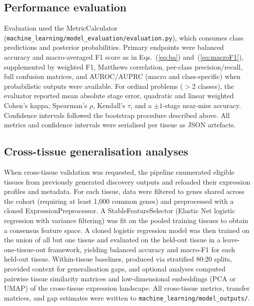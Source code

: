 \documentclass[11pt]{article}
\begin{document}
\subsection{Performance evaluation}
Evaluation used the MetricCalculator (\texttt{machine\_learning/model\_evaluation/evaluation.py}), which consumes class predictions and posterior probabilities. Primary endpoints were balanced accuracy and macro-averaged F1 score as in Eqs.~(\ref{eq:ba}) and~(\ref{eq:macroF1}), supplemented by weighted F1, Matthews correlation, per-class precision/recall, full confusion matrices, and AUROC/AUPRC (macro and class-specific) when probabilistic outputs were available. For ordinal problems ($>$2 classes), the evaluator reported mean absolute stage error, quadratic and linear weighted Cohen's kappa, Spearman's $\rho$, Kendall's $\tau$, and a $\pm 1$-stage near-miss accuracy. Confidence intervals followed the bootstrap procedure described above. All metrics and confidence intervals were serialised per tissue as JSON artefacts.

\subsection{Cross-tissue generalisation analyses}
When cross-tissue validation was requested, the pipeline enumerated eligible tissues from previously generated discovery outputs and reloaded their expression profiles and metadata. For each tissue, data were filtered to genes shared across the cohort (requiring at least 1{,}000 common genes) and preprocessed with a cloned ExpressionPreprocessor. A StableFeatureSelector (Elastic Net logistic regression with variance filtering) was fit on the pooled training tissues to obtain a consensus feature space. A cloned logistic regression model was then trained on the union of all but one tissue and evaluated on the held-out tissue in a leave-one-tissue-out framework, yielding balanced accuracy and macro-F1 for each held-out tissue. Within-tissue baselines, produced via stratified 80:20 splits, provided context for generalisation gaps, and optional analyses computed pairwise tissue similarity matrices and low-dimensional embeddings (PCA or UMAP) of the cross-tissue expression landscape. All cross-tissue metrics, transfer matrices, and gap estimates were written to \texttt{machine\_learning/model\_outputs/}.
\end{document}

